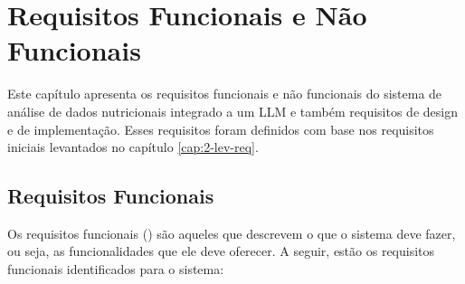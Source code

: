 \chapter{Requisitos Funcionais e Não Funcionais}\label{cap:3-reqs-f-e-nf}

Este capítulo apresenta os requisitos funcionais e não funcionais do sistema de análise de dados nutricionais integrado a um LLM e também requisitos de design e de implementação. Esses requisitos foram definidos com base nos requisitos iniciais levantados no capítulo \ref{cap:2-lev-req}.

\section{Requisitos Funcionais}

Os requisitos funcionais () são aqueles que descrevem o que o sistema deve fazer, ou seja, as funcionalidades que ele deve oferecer. A seguir, estão os requisitos funcionais identificados para o sistema:

